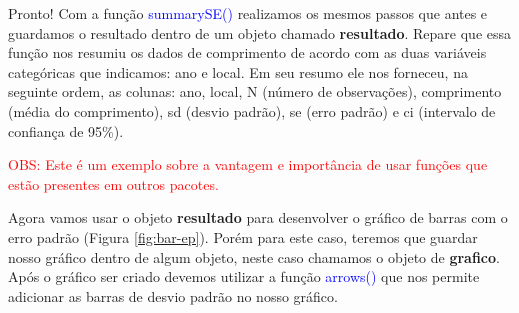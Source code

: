 \documentclass[14pt,titlepage, oneside, openany, a4paper]{book}
\newenvironment{Shaded}{\begin{snugshade}}{\end{snugshade}}
\newcommand{\DataTypeTok}[1]{\textcolor[rgb]{0.13,0.29,0.53}{#1}}
\newcommand{\DecValTok}[1]{\textcolor[rgb]{0.00,0.00,0.81}{#1}}
\newcommand{\FloatTok}[1]{\textcolor[rgb]{0.00,0.00,0.81}{#1}}
\newcommand{\KeywordTok}[1]{\textcolor[rgb]{0.13,0.29,0.53}{\textbf{#1}}}
\newcommand{\NormalTok}[1]{#1}
\newcommand{\OperatorTok}[1]{\textcolor[rgb]{0.81,0.36,0.00}{\textbf{#1}}}
\newcommand{\OtherTok}[1]{\textcolor[rgb]{0.56,0.35,0.01}{#1}}
\newcommand{\StringTok}[1]{\textcolor[rgb]{0.31,0.60,0.02}{#1}}
\begin{document}
Pronto! Com a função \textcolor{blue}{summarySE()} realizamos os mesmos passos que antes e guardamos o resultado dentro de um objeto chamado \textbf{resultado}. Repare que essa função nos resumiu os dados de comprimento de acordo com as duas variáveis categóricas que indicamos: ano e local. Em seu resumo ele nos forneceu, na seguinte ordem, as colunas: ano, local, N (número de observações), comprimento (média do comprimento), sd (desvio padrão), se (erro padrão) e ci (intervalo de confiança de 95\%).

\textcolor{red}{OBS: Este é um exemplo sobre a vantagem e importância de usar funções que estão presentes em outros pacotes.}

Agora vamos usar o objeto \textbf{resultado} para desenvolver o gráfico de barras com o erro padrão (Figura \ref{fig:bar-ep}). Porém para este caso, teremos que guardar nosso gráfico dentro de algum objeto, neste caso chamamos o objeto de \textbf{grafico}. Após o gráfico ser criado devemos utilizar a função \textcolor{blue}{arrows()} que nos permite adicionar as barras de desvio padrão no nosso gráfico.

\begin{Shaded}
\end{Shaded}
\end{document}

